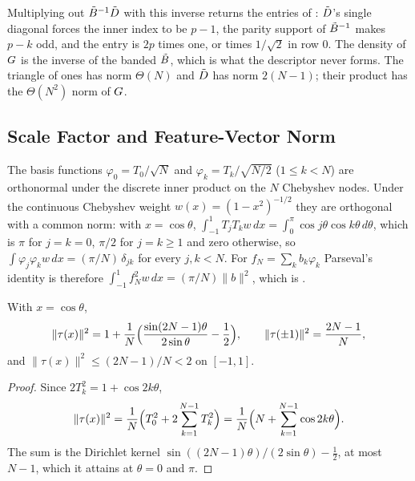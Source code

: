 Multiplying out $\tilde{B}^{-1}\tilde{D}$ with this inverse returns the entries of : $\tilde{D}$'s single diagonal forces the inner index to be $p-1$, the parity support of $\tilde{B}^{-1}$ makes $p-k$ odd, and the entry is $2p$ times one, or times $1/\sqrt2$ in row $0$. The density of $G$ is the inverse of the banded $\tilde{B}$, which is what the descriptor never forms. The triangle of ones has norm $\Theta(N)$ and $\tilde{D}$ has norm $2(N-1)$; their product has the $\Theta(N^2)$ norm of $G$.

\subsection{Scale Factor and Feature-Vector Norm}
\label{app:eta-e}

The basis functions $\varphi_0=T_0/\sqrt N$ and $\varphi_k=T_k/\sqrt{N/2}$ ($1\le k<N$) are orthonormal under the discrete inner product on the $N$ Chebyshev nodes. Under the continuous Chebyshev weight $w(x)=(1-x^2)^{-1/2}$ they are orthogonal with a common norm: with $x=\cos\theta$, $\int_{-1}^1T_jT_kw\,dx=\int_0^\pi\cos j\theta\cos k\theta\,d\theta$, which is $\pi$ for $j=k=0$, $\pi/2$ for $j=k\ge1$ and zero otherwise, so $\int\varphi_j\varphi_kw\,dx=(\pi/N)\,\delta_{jk}$ for every $j,k<N$. For $f_N=\sum_kb_k\varphi_k$ Parseval's identity is therefore $\int_{-1}^1f_N^2w\,dx=(\pi/N)\|b\|^2$, which is .

\begin{proposition}
\label{prop:tau-norm}
With $x=\cos\theta$,
\begin{equation}
    \|\tau(x)\|^2=1+\frac1N\Bigl(\frac{\sin(2N-1)\theta}{2\sin\theta}-\frac12\Bigr),
    \qquad
    \|\tau(\pm1)\|^2=\frac{2N-1}{N},
\end{equation}
and $\|\tau(x)\|^2\le(2N-1)/N<2$ on $[-1,1]$.
\end{proposition}
\begin{proof}
Since $2T_k^2=1+\cos2k\theta$,
\begin{equation*}
    \|\tau(x)\|^2=\frac1N\Bigl(T_0^2+2\sum_{k=1}^{N-1}T_k^2\Bigr)=\frac1N\Bigl(N+\sum_{k=1}^{N-1}\cos2k\theta\Bigr).
\end{equation*}
The sum is the Dirichlet kernel $\sin((2N-1)\theta)/(2\sin\theta)-\tfrac12$, at most $N-1$, which it attains at $\theta=0$ and $\pi$.
\end{proof}

